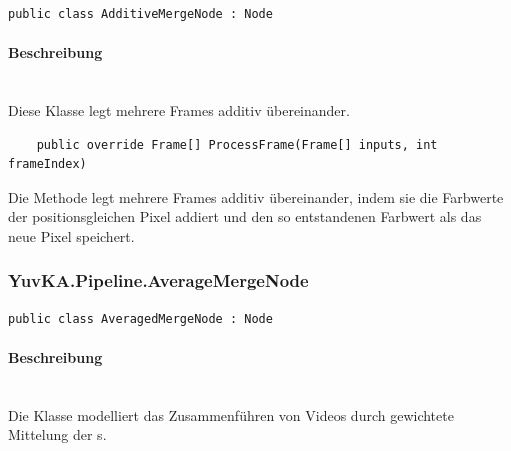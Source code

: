 \begin{verbatim}
public class AdditiveMergeNode : Node
\end{verbatim}

\paragraph{Beschreibung}~\\
Diese Klasse  legt mehrere Frames additiv übereinander.

\begin{itemize}

\begin{verbatim}
	public override Frame[] ProcessFrame(Frame[] inputs, int frameIndex)
\end{verbatim}
Die Methode  legt mehrere Frames additiv übereinander, indem sie die Farbwerte der positionsgleichen Pixel addiert und den so entstandenen Farbwert als das neue Pixel speichert.
\end{itemize}

\subsubsection{YuvKA.Pipeline.AverageMergeNode}

\begin{verbatim}
public class AveragedMergeNode : Node
\end{verbatim}

\paragraph{Beschreibung}~\\
Die Klasse  modelliert das Zusammenführen von Videos durch gewichtete Mittelung der s.

